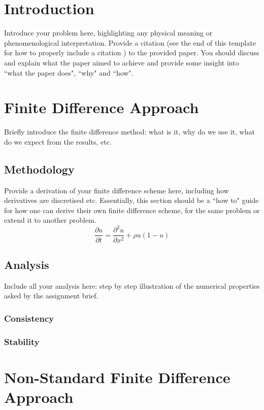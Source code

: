 \documentclass[a4paper]{article}
\begin{document}
\section{Introduction}\label{sec:introduction}
Introduce your problem here, highlighting any physical meaning or phenomenological interpretation. Provide a citation (see the end of this template for how to properly include a citation \cite{mickens}) to the provided paper. You should discuss and explain what the paper aimed to achieve and provide some insight into ``what the paper does", ``why" and ``how". 
\section{Finite Difference Approach}\label{sec:FDM}
	Briefly introduce the finite difference method: what is it, why do we use it, what do we expect from the results, etc.
	\subsection{Methodology}\label{sec:FDmethods}
		Provide a derivation of your finite difference scheme here, including how derivatives are discretised etc. Essentially, this section should be a ``how to" guide for how one can derive their own finite difference scheme, for the same problem or extend it to another problem.
		\newline 
		\newline
		\begin{equation}
		    \frac{\partial u}{\partial t} = \frac{\partial^2 u}{\partial x^2} + \rho u(1-u)
		\end{equation}
		
		
	\subsection{Analysis}\label{sec:FDanalysis}
		Include all your analysis here: step by step illustration of the numerical properties asked by the assignment brief.
		
	\subsubsection{Consistency}
	\subsubsection{Stability}

\section{Non-Standard Finite Difference Approach}\label{sec:Alt}
\end{document}
